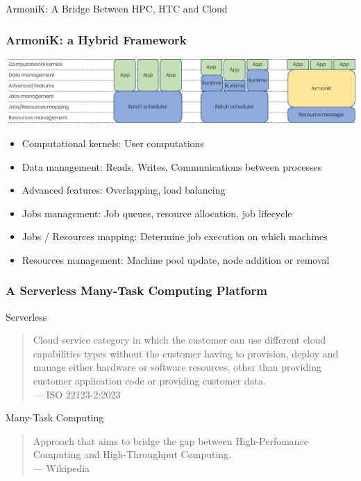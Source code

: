\documentclass[10pt,aspectratio=1609]{beamer}
\begin{document}
\begin{section}{ArmoniK: A Bridge Between HPC, HTC and Cloud}
  
  \begin{frame}
    \frametitle{ArmoniK: a Hybrid Framework}
    \includegraphics[width=\textwidth]{hpc-orchestrators.png}
    \begin{itemize}
      \item Computational kernels: User computations
      \item Data management: Reads, Writes, Communications between processes
      \item Advanced features: Overlapping, load balancing
      \item Jobs management: Job queues, resource allocation, job lifecycle
      \item Jobs / Resources mapping: Determine job execution on which machines
      \item Resources management: Machine pool update, node addition or removal
    \end{itemize}
  \end{frame}

  \begin{frame}
    \frametitle{A Serverless Many-Task Computing Platform}
    \begin{alertblock}{Serverless}
      \begin{quote}
        Cloud service category in which the customer can use different cloud capabilities types
        without the customer having to provision, deploy and manage either hardware or software
        resources, other than providing customer application code or providing customer data.
        \\
        --- ISO 22123-2:2023
      \end{quote}
    \end{alertblock}
    \begin{alertblock}{Many-Task Computing}
      \begin{quote}
        Approach that aims to bridge the gap between High-Perfomance Computing and High-Throughput Computing.
        \\
        --- Wikipedia
      \end{quote}
    \end{alertblock}
  \end{frame}


\end{section}
\end{document}
